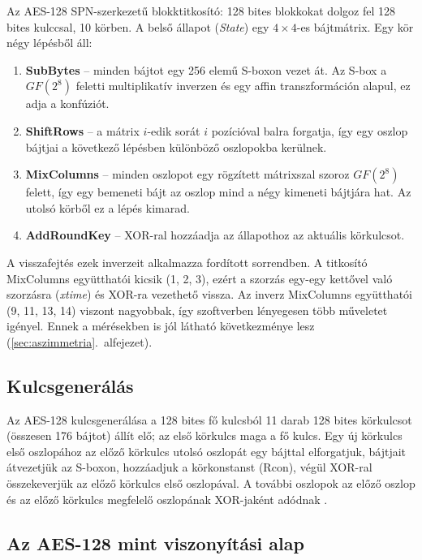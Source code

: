 \documentclass[a4paper,12pt]{report}
\theoremstyle{definition}
\theoremstyle{remark}
\begin{document}
Az AES-128 SPN-szerkezetű blokktitkosító: 128 bites blokkokat dolgoz fel 128 bites kulccsal, 10 körben. A belső állapot (\emph{State}) egy $4 \times 4$-es bájtmátrix. Egy kör négy lépésből áll:

\begin{enumerate}
	\item \textbf{SubBytes} -- minden bájtot egy 256 elemű S-boxon vezet át. Az S-box a $GF(2^8)$ feletti multiplikatív inverzen és egy affin transzformáción alapul, ez adja a konfúziót.
	\item \textbf{ShiftRows} -- a mátrix $i$-edik sorát $i$ pozícióval balra forgatja, így egy oszlop bájtjai a következő lépésben különböző oszlopokba kerülnek.
	\item \textbf{MixColumns} -- minden oszlopot egy rögzített mátrixszal szoroz $GF(2^8)$ felett, így egy bemeneti bájt az oszlop mind a négy kimeneti bájtjára hat. Az utolsó körből ez a lépés kimarad.
	\item \textbf{AddRoundKey} -- XOR-ral hozzáadja az állapothoz az aktuális körkulcsot.
\end{enumerate}

A visszafejtés ezek inverzeit alkalmazza fordított sorrendben. A titkosító MixColumns együtthatói kicsik (1, 2, 3), ezért a szorzás egy-egy kettővel való szorzásra (\emph{xtime}) és XOR-ra vezethető vissza. Az inverz MixColumns együtthatói (9, 11, 13, 14) viszont nagyobbak, így szoftverben lényegesen több műveletet igényel. Ennek a mérésekben is jól látható következménye lesz (\ref{sec:aszimmetria}.~alfejezet).

\subsection{Kulcsgenerálás}\label{sec:aes_kulcs}

Az AES-128 kulcsgenerálása a 128 bites fő kulcsból 11 darab 128 bites körkulcsot (összesen 176 bájtot) állít elő; az első körkulcs maga a fő kulcs. Egy új körkulcs első oszlopához az előző körkulcs utolsó oszlopát egy bájttal elforgatjuk, bájtjait átvezetjük az S-boxon, hozzáadjuk a körkonstanst (Rcon), végül XOR-ral összekeverjük az előző körkulcs első oszlopával. A további oszlopok az előző oszlop és az előző körkulcs megfelelő oszlopának XOR-jaként adódnak \cite{DaemenRijmen2002}.

\subsection{Az AES-128 mint viszonyítási alap}
\end{document}

